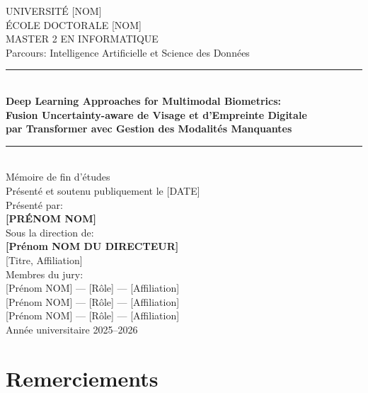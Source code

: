 \documentclass[12pt,a4paper]{report}
\begin{document}
\begin{titlepage}
\centering
\vspace*{2cm}
{\Large UNIVERSIT\'{E} [NOM]}\\[0.5cm]
{\large \'{E}COLE DOCTORALE [NOM]}\\[1cm]
{\Large MASTER 2 EN INFORMATIQUE}\\[0.5cm]
{\large Parcours: Intelligence Artificielle et Science des Donn\'{e}es}\\[2cm]
\rule{\linewidth}{0.5mm}\\[0.5cm]
{\LARGE\bfseries Deep Learning Approaches for Multimodal Biometrics:\\[0.3cm]
Fusion Uncertainty-aware de Visage et d'Empreinte Digitale\\ par Transformer avec Gestion des Modalit\'{e}s Manquantes}\\[0.5cm]
\rule{\linewidth}{0.5mm}\\[1.5cm]
{\large M\'{e}moire de fin d'\'{e}tudes}\\[0.3cm]
{\large Pr\'{e}sent\'{e} et soutenu publiquement le [DATE]}\\[2cm]
{\large Pr\'{e}sent\'{e} par:}\\[0.2cm]
{\Large \textbf{[PR\'{E}NOM NOM]}}\\[2cm]
{\large Sous la direction de:}\\[0.2cm]
{\Large \textbf{[Pr\'{e}nom NOM DU DIRECTEUR]}}\\[0.3cm]
{\large [Titre, Affiliation]}\\[2cm]
{\large Membres du jury:}\\[0.2cm]
{\normalsize [Pr\'{e}nom NOM] --- [R\^{o}le] --- [Affiliation]}\\
{\normalsize [Pr\'{e}nom NOM] --- [R\^{o}le] --- [Affiliation]}\\
{\normalsize [Pr\'{e}nom NOM] --- [R\^{o}le] --- [Affiliation]}\\[1cm]
{\large Ann\'{e}e universitaire 2025--2026}
\end{titlepage}

\chapter*{Remerciements}
\end{document}
